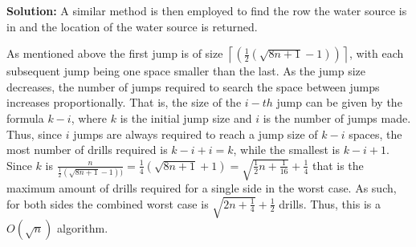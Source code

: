 \documentclass[a4,13pt]{extarticle}
\newenvironment{Solution}{\color{blue}\textbf{Solution:}}{}
\begin{document}
\begin{enumerate}
\begin{enumerate}
\begin{Solution}
				A similar method is then employed to find the row the water source is in and the location of the water source is returned.

				As mentioned above the first jump is of size $\left\lceil{(\frac{1}{2}(\sqrt{8n + 1}- 1))}\right\rceil$, with each subsequent jump being one space smaller than the last. As the jump size decreases, the number of jumps required to search the space between jumps increases proportionally. That is, the size of the $i-th$ jump can be given by the formula $k - i$, where $k$ is the initial jump size and $i$ is the number of jumps made. Thus, since $i$ jumps are always required to reach a jump size of $k - i$ spaces, the most number of drills required is $k - i + i = k$, while the smallest is $k - i + 1$. Since $k$ is $\frac{n}{\frac{1}{2}(\sqrt{8n + 1}- 1))} = \frac{1}{4}(\sqrt{8n + 1} + 1) = \sqrt{\frac{1}{2}n + \frac{1}{16}} + \frac{1}{4}$ that is the maximum amount of drills required for a single side in the worst case. As such, for both sides the combined worst case is $\sqrt{2n + \frac{1}{4}} + \frac{1}{2}$ drills. Thus, this is a $O(\sqrt{n})$ algorithm.
			  \end{Solution}
	      \end{enumerate}     	          
\end{enumerate}
\end{document}

